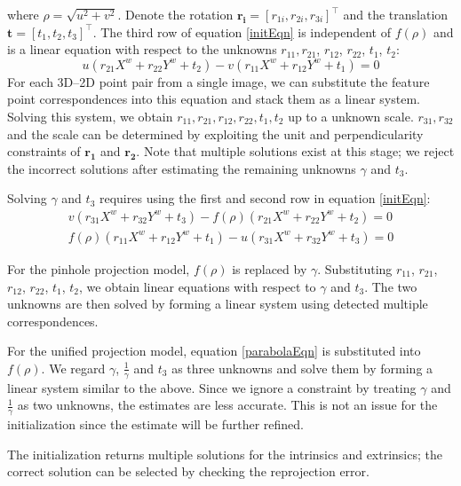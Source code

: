 \documentclass{report}
\begin{document}
where $\rho = \sqrt{u^2 + v^2}$. Denote the rotation $\mathbf{r_i} = [r_{1i}, r_{2i}, r_{3i}]^\top$ and the translation $\mathbf{t} = [t_1, t_2, t_3]^\top$. The third row of equation \ref{initEqn} is independent of $f(\rho)$ and is a linear equation with respect to the unknowns $r_{11}, r_{21}$, $r_{12}$, $r_{22}$, $t_1$, $t_2$:
\begin{equation}
u (r_{21} X^w + r_{22} Y^w + t_2) - v (r_{11} X^w + r_{12} Y^w + t_1) = 0
\end{equation}
For each 3D--2D point pair from a single image, we can substitute the feature point correspondences into this equation and stack them as a linear system. Solving this system, we obtain $r_{11}, r_{21}, r_{12}, r_{22}, t_1, t_2$ up to a unknown scale. $r_{31}, r_{32}$ and the scale can be determined by exploiting the unit and perpendicularity constraints of $\mathbf{r_1}$ and $\mathbf{r_2}$. Note that multiple solutions exist at this stage; we reject the incorrect solutions after estimating the remaining unknowns $\gamma$ and $t_3$. 

Solving $\gamma$ and $t_3$ requires using the first and second row in equation \ref{initEqn}:
\begin{eqnarray}
v (r_{31} X^w + r_{32} Y^w + t_3) - f(\rho) (r_{21} X^w + r_{22} Y^w + t_2) = 0 \\ 
f(\rho) (r_{11} X^w + r_{12} Y^w + t_1) - u (r_{31} X^w + r_{32} Y^w + t_3) = 0
\end{eqnarray}

For the pinhole projection model, $f(\rho)$ is replaced by $\gamma$. Substituting $r_{11}$, $r_{21}$, $r_{12}$, $r_{22}$, $t_1$, $t_2$, we obtain linear equations with respect to $\gamma$ and $t_3$. The two unknowns are then solved by forming a linear system using detected multiple correspondences. 

For the unified projection model, equation \ref{parabolaEqn} is substituted into $f(\rho)$. We regard $\gamma$, $\frac{1}{\gamma}$ and $t_3$ as three unknowns and solve them by forming a linear system similar to the above. Since we ignore a constraint by treating $\gamma$ and $\frac{1}{\gamma}$ as two unknowns, the estimates are less accurate. This is not an issue for the initialization since the estimate will be further refined. 

The initialization returns multiple solutions for the intrinsics and extrinsics; the correct solution can be selected by checking the reprojection error. 
\end{document}
